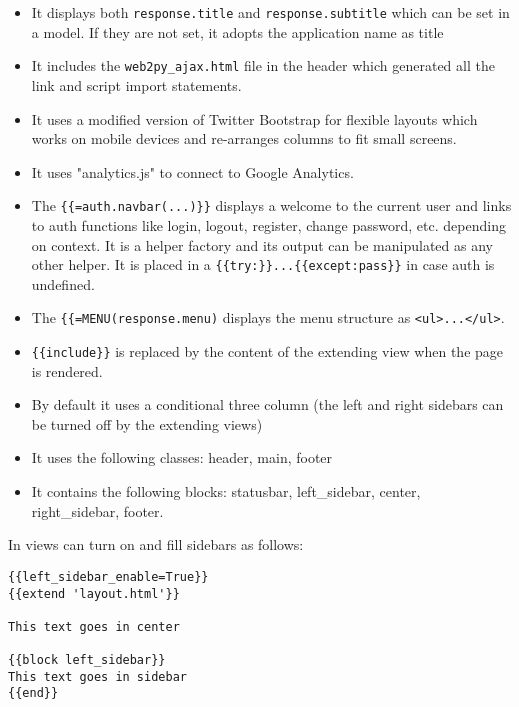 \documentclass[justified,sixbynine,notoc]{tufte-book}
\def\ft{\small\tt}
\begin{document}
\begin{fullwidth}
\begin{itemize}
\item It displays both {\ft response.title} and {\ft response.subtitle} which can be set in a model. If they are not set, it adopts the application name as title

\item It includes the {\ft web2py\_ajax.html} file in the header which generated all the link and script import statements.

\item It uses a modified version of Twitter Bootstrap for flexible layouts which works on mobile devices and re-arranges columns to fit small screens.

\item It uses "analytics.js" to connect to Google Analytics.

\item The {\ft \{\{=auth.navbar(...)\}\}} displays a welcome to the current user and links to auth functions like login, logout, register, change password, etc. depending on context. It is a helper factory and its output can be manipulated as any other helper. It is placed in a {\ft \{\{try:\}\}...\{\{except:pass\}\}} in case auth is undefined.

\item The {\ft \{\{=MENU(response.menu)} displays the menu structure as {\ft <ul>...</ul>}.

\item {\ft \{\{include\}\}} is replaced by the content of the extending view when the page is rendered.

\item By default it uses a conditional three column (the left and right sidebars can be turned off by the extending views)

\item It uses the following classes: header, main, footer

\item It contains the following blocks: statusbar, left\_sidebar, center, right\_sidebar, footer.
\end{itemize}

In views can turn on and fill sidebars as follows:

\begin{lstlisting}[keywords={}]
{{left_sidebar_enable=True}}
{{extend 'layout.html'}}

This text goes in center

{{block left_sidebar}}
This text goes in sidebar
{{end}}
\end{lstlisting}


\end{fullwidth}
\end{document}

